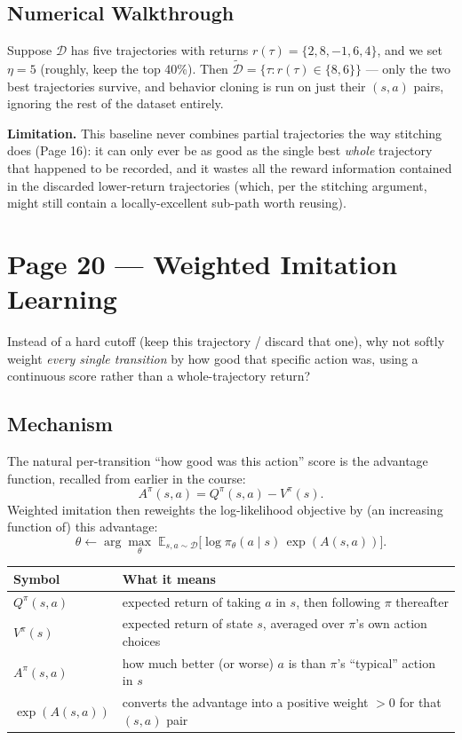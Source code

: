 \documentclass[11pt]{article}
\begin{document}
\subsection*{Numerical Walkthrough}

Suppose $\mathcal D$ has five trajectories with returns $r(\tau) = \{2, 8, -1, 6, 4\}$, and we set $\eta = 5$ (roughly, keep the top 40\%). Then $\widetilde{\mathcal D} = \{\tau : r(\tau) \in \{8, 6\}\}$ --- only the two best trajectories survive, and behavior cloning is run on just their $(s,a)$ pairs, ignoring the rest of the dataset entirely.

\textbf{Limitation.} This baseline never combines partial trajectories the way stitching does (Page 16): it can only ever be as good as the single best \emph{whole} trajectory that happened to be recorded, and it wastes all the reward information contained in the discarded lower-return trajectories (which, per the stitching argument, might still contain a locally-excellent sub-path worth reusing).

\section*{Page 20 --- Weighted Imitation Learning}

Instead of a hard cutoff (keep this trajectory / discard that one), why not softly weight \emph{every single transition} by how good that specific action was, using a continuous score rather than a whole-trajectory return?

\subsection*{Mechanism}

The natural per-transition ``how good was this action'' score is the advantage function, recalled from earlier in the course:
\[
A^\pi(s,a) = Q^\pi(s,a) - V^\pi(s).
\]
Weighted imitation then reweights the log-likelihood objective by (an increasing function of) this advantage:
\[
\theta \leftarrow \arg\max_\theta\; \mathbb{E}_{s,a\sim\mathcal{D}}\big[\log \pi_\theta(a\mid s)\, \exp(A(s,a))\big].
\]

\begin{center}
\begin{tabular}{@{}ll@{}}
\toprule
Symbol & What it means \\
\midrule
$Q^\pi(s,a)$ & expected return of taking $a$ in $s$, then following $\pi$ thereafter \\
$V^\pi(s)$ & expected return of state $s$, averaged over $\pi$'s own action choices \\
$A^\pi(s,a)$ & how much better (or worse) $a$ is than $\pi$'s ``typical'' action in $s$ \\
$\exp(A(s,a))$ & converts the advantage into a positive weight $> 0$ for that $(s,a)$ pair \\
\bottomrule
\end{tabular}
\end{center}
\end{document}
